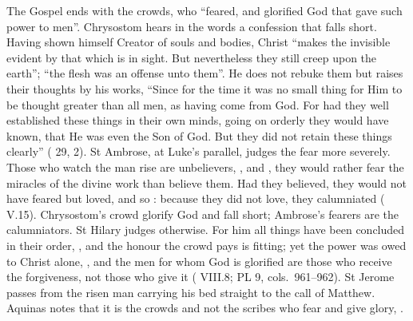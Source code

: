 The Gospel ends with the crowds, who ``feared, and glorified God that gave such
power to men''. Chrysostom hears in the words a confession that falls short.
Having shown himself Creator of souls and bodies, Christ ``makes the invisible
evident by that which is in sight. But nevertheless they still creep upon the
earth''; ``the flesh was an offense unto them''. He does not rebuke them but
raises their thoughts by his works, ``Since for the time it was no small thing
for Him to be thought greater than all men, as having come from God. For had
they well established these things in their own minds, going on orderly they
would have known, that He was even the Son of God. But they did not retain
these things clearly'' ( 29, 2). St Ambrose, at
Luke's parallel, judges the fear more severely. Those who watch the man rise
are unbelievers, , and , they would rather fear the
miracles of the divine work than believe them. Had they believed, they would
not have feared but loved, and so : because they did not love, they calumniated
( V.15). Chrysostom's crowd glorify God and fall
short; Ambrose's fearers are the calumniators. St Hilary judges otherwise. For him all things have been concluded in their
order, , and the honour the crowd pays is
fitting; yet the power was owed to Christ alone, , and the men for whom God is glorified are those who
receive the forgiveness, not those who give it ( VIII.8; PL 9, cols.~961--962). St Jerome passes from the risen man carrying his
bed straight to the call of Matthew. Aquinas notes that it is the crowds and
not the scribes who fear and give glory, .

